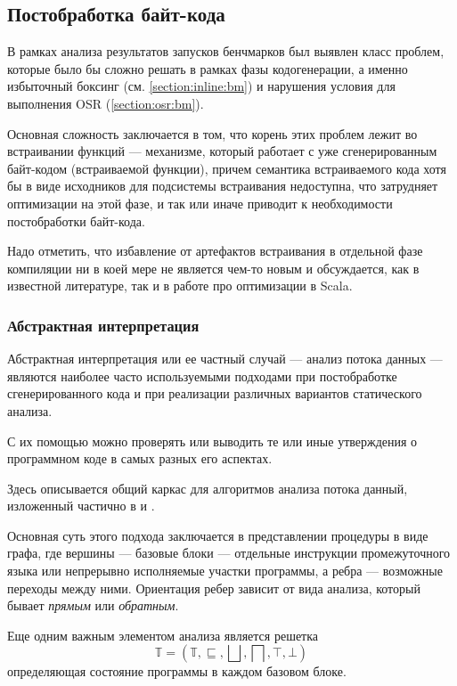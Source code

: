 \subsection{Постобработка байт-кода}
\label{section:postp}
В рамках анализа результатов запусков бенчмарков был выявлен класс проблем, которые было бы сложно
решать в рамках фазы кодогенерации, а именно избыточный боксинг (см. \ref{section:inline:bm}) и
нарушения условия для выполнения OSR (\ref{section:osr:bm}).

Основная сложность заключается в том, что корень этих проблем лежит во встраивании функций ---
механизме, который работает с уже сгенерированным байт-кодом (встраиваемой функции), причем
семантика встраиваемого кода хотя бы в виде исходников для подсистемы встраивания недоступна,
что затрудняет оптимизации на этой фазе, и так или иначе приводит к необходимости постобработки
байт-кода.

Надо отметить, что избавление от артефактов встраивания в отдельной фазе компиляции ни в коей мере
не является чем-то новым и обсуждается, как в известной литературе\cite{Muchnick}, так и в работе
про оптимизации в Scala\cite{ScalaDragos}.

\subsubsection{Абстрактная интерпретация}
Абстрактная интерпретация или ее частный случай --- анализ потока данных --- являются наиболее
часто используемыми подходами при постобработке сгенерированного кода и при реализации
различных вариантов статического анализа.

С их помощью можно проверять или выводить те или иные утверждения о программном коде в самых разных
его аспектах.

Здесь описывается общий каркас для алгоритмов анализа потока данный, изложенный частично в \cite{Muchnick}
и \cite{Nielson}.

Основная суть этого подхода заключается в представлении процедуры в виде графа, где вершины ---
базовые блоки --- отдельные инструкции промежуточного языка или непрерывно исполняемые участки
программы, а ребра --- возможные переходы между ними.
Ориентация ребер зависит от вида анализа, который бывает \textit{прямым} или \textit{обратным}.

Еще одним важным элементом анализа является решетка
$$\mathbb{T} = (\mathbb{T}, \sqsubseteq, \bigsqcup, \bigsqcap, \top, \bot)$$
определяющая состояние программы в каждом базовом блоке.

